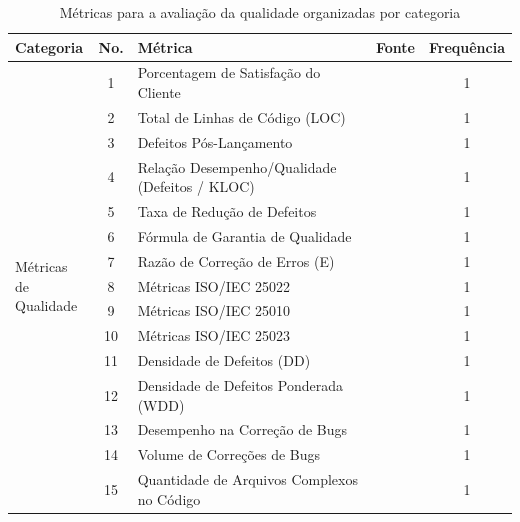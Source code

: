 \documentclass[sigconf]{acmart}
\begin{document}
\begin{table}[t]
\centering
\setcounter{table}{11}
\caption{Métricas para a avaliação da qualidade organizadas por categoria}
\label{tab:metricas_ape}
\begin{tabular}{p{3.6cm} c p{8cm} c c}
\toprule
\textbf{Categoria} & \textbf{No.} & \textbf{Métrica} & \textbf{Fonte} & \textbf{Frequência} \\
\midrule
\multirow{21}{2.6cm}{\parbox{3.2cm}{Métricas de\\Qualidade}}
 & 1  & Porcentagem de Satisfação do Cliente                              & \cite{Khalid:2019}   & 1 \\
 & 2  & Total de Linhas de Código (LOC)                                   & \cite{Khalid:2019}   & 1 \\
 & 3  & Defeitos Pós-Lançamento                                           & \cite{Khalid:2019}   & 1 \\
 & 4  & Relação Desempenho/Qualidade (Defeitos / KLOC)                    & \cite{Khalid:2019}   & 1 \\
 & 5  & Taxa de Redução de Defeitos                                       & \cite{Rahman:2020}   & 1 \\
 & 6  & Fórmula de Garantia de Qualidade                                  & \cite{Rahman:2020}   & 1 \\
 & 7  & Razão de Correção de Erros (E)                                    & \cite{Misra:2021}    & 1 \\
 & 8  & Métricas ISO/IEC 25022                                            & \cite{Guerrero:2022} & 1 \\
 & 9  & Métricas ISO/IEC 25010                                            & \cite{Sivaram:2026}  & 1 \\
 & 10 & Métricas ISO/IEC 25023                                            & \cite{Guerrero:2022} & 1 \\
 & 11 & Densidade de Defeitos (DD)                                        & \cite{Azhar:2023}    & 1 \\
 & 12 & Densidade de Defeitos Ponderada (WDD)                             & \cite{Azhar:2023}    & 1 \\
 & 13 & Desempenho na Correção de Bugs                                    & \cite{Karhapaa:2024} & 1 \\
 & 14 & Volume de Correções de Bugs                                       & \cite{Karhapaa:2024} & 1 \\
 & 15 & Quantidade de Arquivos Complexos no Código                        & \cite{Karhapaa:2024} & 1 \\

\end{tabular}
\end{table}
\end{document}
